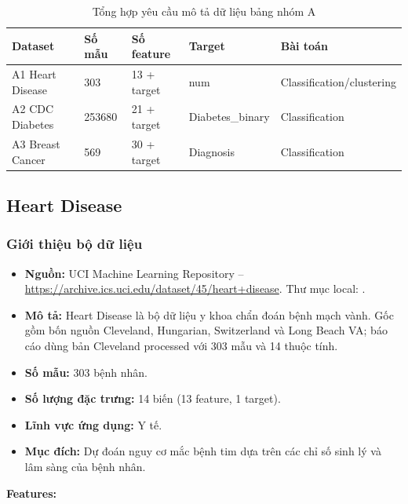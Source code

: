 \begin{table}[H]
\centering
\caption{Tổng hợp yêu cầu mô tả dữ liệu bảng nhóm A}
\label{tab:group_a_rubric_summary}
\small
\begin{tabular}{lllll}
\toprule
Dataset & Số mẫu & Số feature & Target & Bài toán \\
\midrule
A1 Heart Disease & 303 & 13 + target & num & Classification/clustering \\
A2 CDC Diabetes & 253680 & 21 + target & Diabetes\_binary & Classification \\
A3 Breast Cancer & 569 & 30 + target & Diagnosis & Classification \\
\bottomrule
\end{tabular}
\end{table}

\subsection{Heart Disease}

\subsubsection{Giới thiệu bộ dữ liệu}

\begin{itemize}
 \item \textbf{Nguồn:} UCI Machine Learning Repository -- \url{https://archive.ics.uci.edu/dataset/45/heart+disease}. Thư mục local: .
 \item \textbf{Mô tả:} Heart Disease là bộ dữ liệu y khoa chẩn đoán bệnh mạch vành. Gốc gồm bốn nguồn Cleveland, Hungarian, Switzerland và Long Beach VA; báo cáo dùng bản Cleveland processed với 303 mẫu và 14 thuộc tính.
 \item \textbf{Số mẫu:} 303 bệnh nhân.
 \item \textbf{Số lượng đặc trưng:} 14 biến (13 feature, 1 target).
 \item \textbf{Lĩnh vực ứng dụng:} Y tế.
 \item \textbf{Mục đích:} Dự đoán nguy cơ mắc bệnh tim dựa trên các chỉ số sinh lý và lâm sàng của bệnh nhân.
\end{itemize}

\textbf{Features:}

